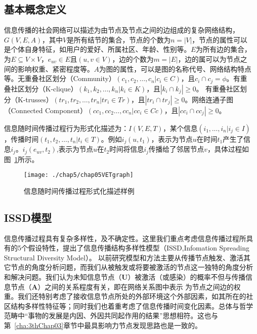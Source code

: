 \subsection{基本概念定义}
信息传播的社会网络可以描述为由节点及节点之间的边组成的复杂网络结构，$G(V,E,A)$，其中$V$是所有结节的集合，节点的个数为$n=|V|$，节点的属性可以是个体自身特征，如用户的爱好、所属社区、年龄、性别等。$E$为所有边的集合，为$E\subseteq V\times V$，$e_{uv}\in E$且$(u,v \in V)$，边的个数为$m=|E|$，边的属可以为节点之间的影响权重、紧密程度等。$A$为图的属性，可以是图的名称代号、网络结构特点等。无重叠社区划分（Community）$(c_1,c_2,\dots,c_n|c_i \in C)$，且$c_i\cap c_j = \phi$。有重叠社区划分（K-clique）$(k_1,k_2,\dots,k_n|k_i \in K)$，且$|k_i\cap k_j| \geq 0$。 有重叠社区划分（K-trusses）$(tr_1,tr_2,\dots,tr_n|tr_i \in Tr)$，且$|tr_i\cap tr_j| \geq 0$。网络连通子图（Connected Component）$(cc_1,cc_2\dots,cc_n|cc_i \in Cc)$，且$|cc_i\cap cc_j| \geq 0$。

信息随时间传播过程行为形式化描述为：$I(V,E,T)$，某个信息$(i_1,\dots,i_n|i_j \in I)$，传播时间$(t_1,t_2,\dots,t_n|t_i \in T)$。例如$i_j(u,t_1)$，表示为节点$u$在时间$t_1$产生了信息$i_j$。$i_j(e_{uv},t_2)$,表示为节点$u$在$t_2$时间将信息$i_j$传播给了邻居节点$v$，具体过程如图~\ref{fig:chap05VETgraph}所示。
\begin{figure}[H] 
	\centering
	\texttt{[image: ./chap5/chap05VETgraph]}
	\caption{信息随时间传播过程形式化描述样例}
	\label{fig:chap05VETgraph}
\end{figure}
\subsection{ISSD模型}
信息传播过程具有复杂多样性，及不确定性。这里我们重点考虑信息传播过程所具有的5个假设特性，提出了信息传播结构多样性模型（ISSD,Infomation Spreading Structural Diversity Model）。
以前研究模型和方法主要从传播节点触发、激活其它节点的角度分析问题，而我们从被触发或将要被激活的节点这一独特的角度分析和解决问题。我们认为未知信息节点（\textbf{U}）被激活（或感染）的概率不但与传播信息节点（\textbf{A}）之间的关系程度有关，即在网络关系图中表示 为节点之间边的权重。我们还特别考虑了接收信息节点所处的外部环境这个外部因素，如其所在的社区结构多样性特征等；同时我们也着重考虑了信息传播时间变化因素。总体与哲学范畴中“事物的发展是内因、外因共同起作用的结果”思想相符。这也与第~\ref{cha:3thChap03}章节中最具影响力节点发现思路也是一致的。

